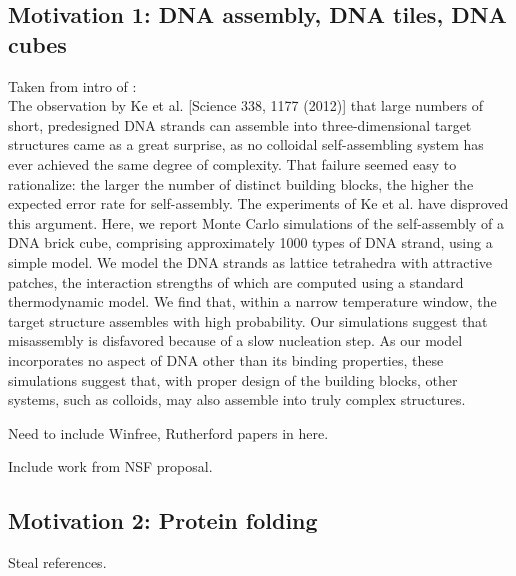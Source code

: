 \subsection{Motivation 1: DNA assembly, DNA tiles, DNA cubes}

Taken from intro of \cite{Reinhardt_2014_PRL}: \\
The observation by Ke et al. [Science 338, 1177 (2012)] that large numbers of short, predesigned
DNA strands can assemble into three-dimensional target structures came as a great surprise, as no colloidal
self-assembling system has ever achieved the same degree of complexity. That failure seemed easy to
rationalize: the larger the number of distinct building blocks, the higher the expected error rate for
self-assembly. The experiments of Ke et al. have disproved this argument. Here, we report Monte Carlo
simulations of the self-assembly of a DNA brick cube, comprising approximately 1000 types of DNA
strand, using a simple model. We model the DNA strands as lattice tetrahedra with attractive patches, the
interaction strengths of which are computed using a standard thermodynamic model. We find that, within a
narrow temperature window, the target structure assembles with high probability. Our simulations suggest
that misassembly is disfavored because of a slow nucleation step. As our model incorporates no aspect of
DNA other than its binding properties, these simulations suggest that, with proper design of the building
blocks, other systems, such as colloids, may also assemble into truly complex structures.

Need to include Winfree, Rutherford papers in here.

Include work from NSF proposal.

\subsection{Motivation 2: Protein folding}

Steal references.




